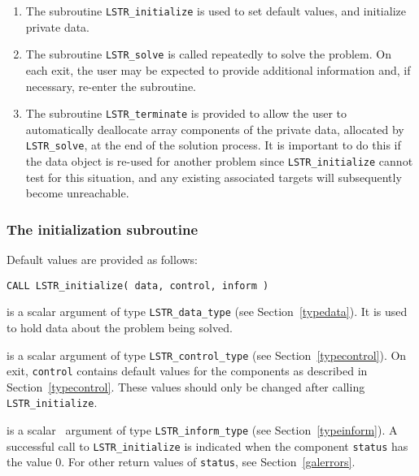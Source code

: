 \documentclass{galahad}
\newcommand{\packagename}{LS\-TR}
\begin{document}
\begin{enumerate}
\item The subroutine
      {\tt \packagename\_initialize}
      is used to set default values, and initialize private data.
\item The subroutine
      {\tt \packagename\_solve}
      is called repeatedly to solve the problem.
      On each exit, the user may be expected to provide additional
      information and, if necessary, re-enter the subroutine.
\item The subroutine
      {\tt \packagename\_terminate}
      is provided to allow the user to automatically deallocate array
       components of the private data, allocated by
       {\tt \packagename\_solve},
       at the end of the solution process.
       It is important to do this if the data object is re-used for another
       problem since {\tt \packagename\_initialize} cannot test for this
       situation,
       and any existing associated targets will subsequently become
       unreachable.
\end{enumerate}


\subsubsection{The initialization subroutine}\label{subinit}
 Default values are provided as follows:

\hskip0.5in
{\tt CALL \packagename\_initialize( data, control, inform )}

\begin{description}

 is a scalar \intentinout argument of type
{\tt \packagename\_data\_type}
(see Section~\ref{typedata}). It is used to hold data about the problem being
solved.

 is a scalar \intentout argument of type
{\tt \packagename\_control\_type}
(see Section~\ref{typecontrol}).
On exit, {\tt control} contains default values for the components as
described in Section~\ref{typecontrol}.
These values should only be changed after calling
{\tt \packagename\_initialize}.

 is a scalar \intentout\ argument of type
{\tt \packagename\_inform\_type}
(see Section~\ref{typeinform}). A successful call to
{\tt \packagename\_initialize}
is indicated when the  component {\tt status} has the value 0.
For other return values of {\tt status}, see Section~\ref{galerrors}.

\end{description}
\end{document}
